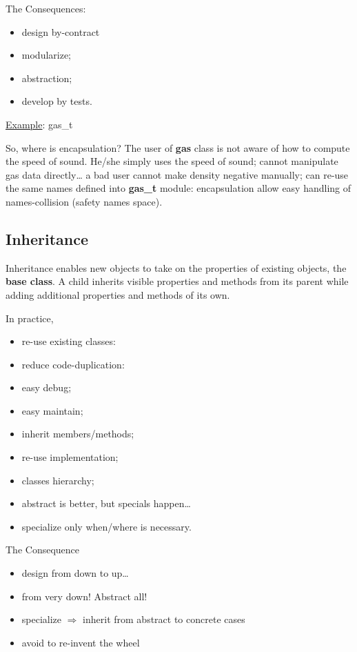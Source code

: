 \documentclass[11pt]{book} %
\begin{document}
The Consequences:
\begin{itemize}
\item design by-contract
\item modularize;
\item abstraction;
\item develop by tests.
\end{itemize}

\underline{Example}: gas\_t

So, where is encapsulation? The user of \textbf{gas} class is not aware of how to compute the speed of sound. He/she simply uses the speed of sound; cannot manipulate gas data directly…
a bad user cannot make density negative manually;
can re-use the same names defined into \textbf{gas\_t} module:
encapsulation allow easy handling of names-collision (safety names space).

\subsection{Inheritance}
Inheritance enables new objects to take on the properties of existing objects, the \textbf{base class}. A child inherits visible properties and methods from its parent while adding additional properties and methods of its own.

In practice,
\begin{itemize}
\item re-use existing classes:
\item reduce code-duplication:
\item easy debug;
\item easy maintain;
\item inherit members/methods;
\item re-use implementation;
\item classes hierarchy;
\item abstract is better, but specials happen…
\item specialize only when/where is necessary.
\end{itemize}

The Consequence
\begin{itemize}
\item design from down to up…
\item from very down! Abstract all!
\item specialize $\Rightarrow$ inherit from abstract to concrete cases
\item avoid to re-invent the wheel
\end{itemize}
\end{document}
